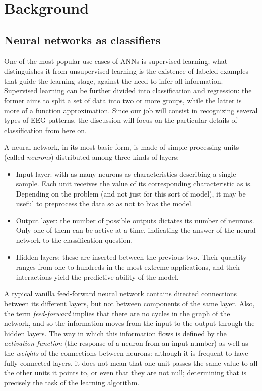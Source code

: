 \chapter{Background}\label{ch:background}

\section{Neural networks as classifiers}

	One of the most popular use cases of \acs{ANN}s is supervised learning; what distinguishes it from unsupervised learning is the existence of labeled examples that guide the learning stage, against the need to infer all information. Supervised learning can be further divided into classification and regression: the former aims to split a set of data into two or more groups, while the latter is more of a function approximation. Since our job will consist in recognizing several types of \acs{EEG} patterns, the discussion will focus on the particular details of classification from here on.

	A neural network, in its most basic form, is made of simple processing units (called \textit{neurons}) distributed among three kinds of layers:

	\begin{itemize}

		\item
		Input layer: with as many neurons as characteristics describing a single sample. Each unit receives the value of its corresponding characteristic as is. Depending on the problem (and not just for this sort of model), it may be useful to preprocess the data so as not to bias the model.

		\item
		Output layer: the number of possible outputs dictates its number of neurons. Only one of them can be active at a time, indicating the answer of the neural network to the classification question.

		\item
		Hidden layers: these are inserted between the previous two. Their quantity ranges from one to hundreds in the most extreme applications, and their interactions yield the predictive ability of the model.

	\end{itemize}

	A typical vanilla feed-forward neural network contains directed connections between its different layers, but not between components of the same layer. Also, the term \textit{feed-forward} implies that there are no cycles in the graph of the network, and so the information moves from the input to the output through the hidden layers. The way in which this information flows is defined by the \textit{activation function} (the response of a neuron from an input number) as well as the \textit{weights} of the connections between neurons: although it is frequent to have fully-connected layers, it does not mean that one unit passes the same value to all the other units it points to, or even that they are not null; determining that is precisely the task of the learning algorithm.

